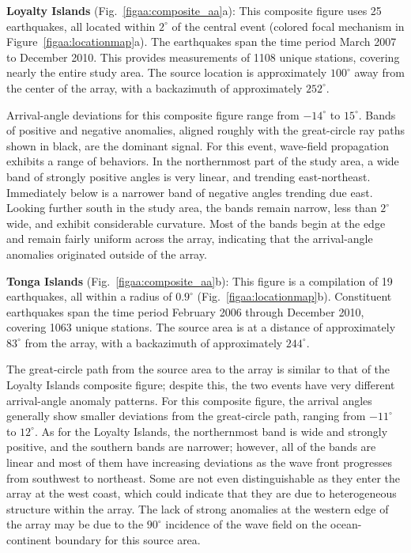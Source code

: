 \documentclass[12pt,oneside]{book}
\newcommand{\degree}[1]{\mbox{$#1^{\circ}$}}
\begin{document}
\textbf{Loyalty Islands} (Fig.~\ref{figaa:composite_aa}a): This composite figure uses 25 earthquakes, all located within \degree{2} of the central event (colored focal mechanism in Figure~\ref{figaa:locationmap}a). The earthquakes span the time period March 2007 to December 2010. This provides measurements of 1108 unique stations, covering nearly the entire study area. The source location is approximately \degree{100} away from the center of the array, with a backazimuth of approximately \degree{252}. 

Arrival-angle deviations for this composite figure range from \degree{-14} to \degree{15}. Bands of positive and negative anomalies, aligned roughly with the great-circle ray paths shown in black, are the dominant signal. For this event, wave-field propagation exhibits a range of behaviors. In the northernmost part of the study area, a wide band of strongly positive angles is very linear, and trending east-northeast. Immediately below is a narrower band of negative angles trending due east. Looking further south in the study area, the bands remain narrow, less than \degree{2} wide, and exhibit considerable curvature. Most of the bands begin at the edge and remain fairly uniform across the array, indicating that the arrival-angle anomalies originated outside of the array. 

\textbf{Tonga Islands} (Fig.~\ref{figaa:composite_aa}b): This figure is a compilation of 19 earthquakes, all within a radius of \degree{0.9} (Fig.~\ref{figaa:locationmap}b). Constituent earthquakes span the time period February 2006 through December 2010, covering 1063 unique stations. The source area is at a distance of approximately \degree{83} from the array, with a backazimuth of approximately \degree{244}. 

The great-circle path from the source area to the array is similar to that of the Loyalty Islands composite figure; despite this, the two events have very different arrival-angle anomaly patterns. For this composite figure, the arrival angles generally show smaller deviations from the great-circle path, ranging from \degree{-11} to \degree{12}. As for the Loyalty Islands, the northernmost band is wide and strongly positive, and the southern bands are narrower; however, all of the bands are linear and most of them have increasing deviations as the wave front progresses from southwest to northeast. Some are not even distinguishable as they enter the array at the west coast, which could indicate that they are due to heterogeneous structure within the array. The lack of strong anomalies at the western edge of the array may be due to the \degree{90} incidence of the wave field on the ocean-continent boundary for this source area. 
\end{document}
